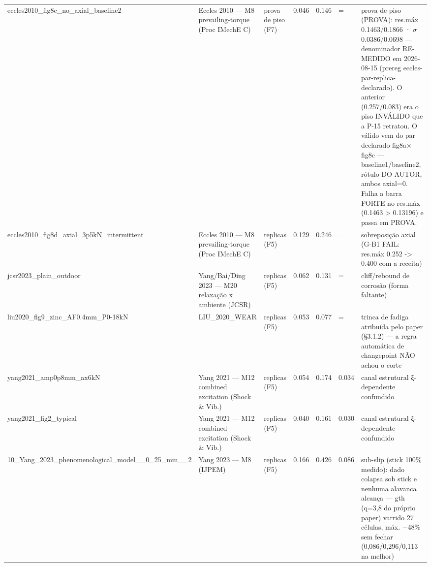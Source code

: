 \begin{table}[t]
\begin{tabular}{lllllll}
eccles2010\_fig8c\_no\_axial\_baseline2 & Eccles 2010 — M8 prevailing-torque (Proc IMechE C) & prova de piso (F7) & 0.046 & 0.146 & = & prova de piso (PROVA): res.máx 0.1463/0.1866 · $\sigma$ 0.0386/0.0698 — denominador RE-MEDIDO em 2026-08-15 (prereg eccles-par-replica-declarado). O anterior (0.257/0.083) era o piso INVÁLIDO que a P-15 retratou. O válido vem do par declarado fig8a$\times$fig8c — baseline1/baseline2, rótulo DO AUTOR, ambos axial=0. Falha a barra FORTE no res.máx (0.1463 > 0.13196) e passa em PROVA. \\
eccles2010\_fig8d\_axial\_3p5kN\_intermittent & Eccles 2010 — M8 prevailing-torque (Proc IMechE C) & replicas (F5) & 0.129 & 0.246 & = & sobreposição axial (G-B1 FAIL: res.máx 0.252 -> 0.400 com a receita) \\
jcsr2023\_plain\_outdoor & Yang/Bai/Ding 2023 — M20 relaxação x ambiente (JCSR) & replicas (F5) & 0.062 & 0.131 & = & cliff/rebound de corrosão (forma faltante) \\
liu2020\_fig9\_zinc\_AF0.4mm\_P0-18kN & LIU\_2020\_WEAR & replicas (F5) & 0.053 & 0.077 & = & trinca de fadiga atribuída pelo paper (§3.1.2) — a regra automática de changepoint NÃO achou o corte \\
yang2021\_amp0p8mm\_ax6kN & Yang 2021 — M12 combined excitation (Shock \& Vib.) & replicas (F5) & 0.054 & 0.174 & 0.034 & canal estrutural ξ-dependente confundido \\
yang2021\_fig2\_typical & Yang 2021 — M12 combined excitation (Shock \& Vib.) & replicas (F5) & 0.040 & 0.161 & 0.030 & canal estrutural ξ-dependente confundido \\
10\_Yang\_2023\_phenomenological\_model\_\_0\_25\_mm\_\_2 & Yang 2023 — M8 (IJPEM) & replicas (F5) & 0.166 & 0.426 & 0.086 & sub-slip (stick 100\% medido): dado colapsa sob stick e nenhuma alavanca alcança — gth (q=3,8 do próprio paper) varrido 27 células, máx. −48\% sem fechar (0,086/0,296/0,113 na melhor) \\
\bottomrule
\end{tabular}
\end{table}
